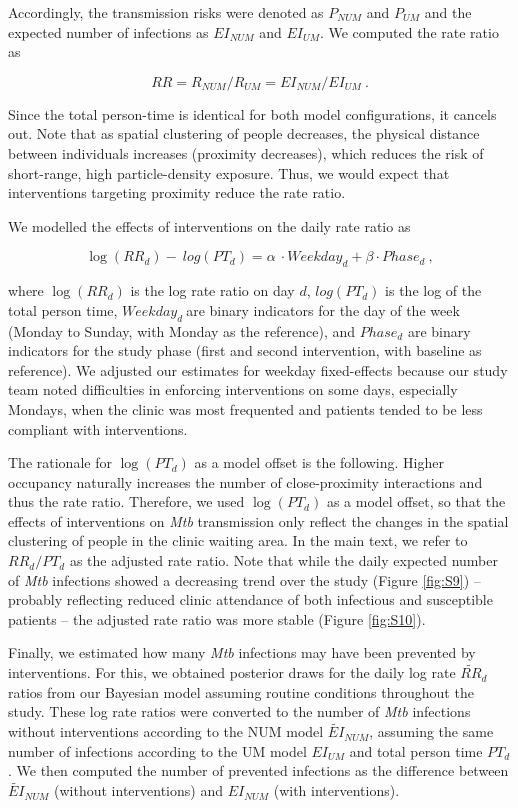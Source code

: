\documentclass[11pt]{article}
\begin{document}
Accordingly, the transmission risks were denoted as \(P_{NUM}\) and \(P_{UM}\) and the expected number of infections as \({EI}_{NUM}\) and \({EI}_{UM}\). We computed the rate ratio as

\[RR = R_{NUM}/R_{UM} = EI_{NUM}/EI_{UM}~.\]

Since the total person-time is identical for both model configurations, it cancels out. Note that as spatial clustering of people decreases, the physical distance between individuals increases (proximity decreases), which reduces the risk of short-range, high particle-density exposure. Thus, we would expect that interventions targeting proximity reduce the rate ratio.

We modelled the effects of interventions on the daily rate ratio as

\[\log(RR_{d}) - \ log(PT_{d}) = \alpha\  \cdot Weekday_{d} + \beta \cdot Phase_{d}~,\]

where \(\log(RR_{d})\) is the log rate ratio on day \(d\), \(log(PT_{d})\) is the log of the total person time, \(Weekday_{d}\ \)are binary indicators for the day of the week (Monday to Sunday, with Monday as the reference), and \(Phase_{d}\) are binary indicators for the study phase (first and second intervention, with baseline as reference). We adjusted our estimates for weekday fixed-effects because our study team noted difficulties in enforcing interventions on some days, especially Mondays, when the clinic was most frequented and patients tended to be less compliant with interventions.

The rationale for \(\log(PT_{d})\) as a model offset is the following. Higher occupancy naturally increases the number of close-proximity interactions and thus the rate ratio. Therefore, we used \(\log(PT_{d})\) as a model offset, so that the effects of interventions on \emph{Mtb} transmission only reflect the changes in the spatial clustering of people in the clinic waiting area. In the main text, we refer to \(RR_{d}/PT_{d}\) as the adjusted rate ratio. Note that while the daily expected number of \emph{Mtb} infections showed a decreasing trend over the study (Figure \ref{fig:S9}) -- probably reflecting reduced clinic attendance of both infectious and susceptible patients -- the adjusted rate ratio was more stable (Figure \ref{fig:S10}).

Finally, we estimated how many \emph{Mtb} infections may have been prevented by interventions. For this, we obtained posterior draws for the daily log rate \({\widetilde{RR}}_{d}\) ratios from our Bayesian model assuming routine conditions throughout the study. These log rate ratios were converted to the number of \emph{Mtb} infections without interventions according to the NUM model \({\widetilde{EI}}_{NUM}\), assuming the same number of infections according to the UM model \({EI}_{UM}\) and total person time \(PT_{d}\). We then computed the number of prevented infections as the difference between \({\widetilde{EI}}_{NUM}\) (without interventions) and \({EI}_{NUM}\) (with interventions).
\end{document}
